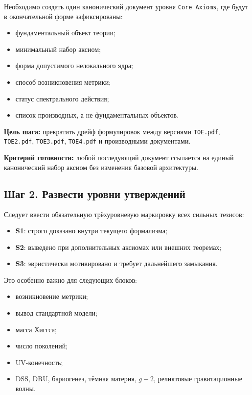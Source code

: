 \documentclass[12pt,a4paper]{article}
\begin{document}
Необходимо создать один канонический документ уровня \texttt{Core Axioms}, где будут в окончательной форме зафиксированы:
\begin{itemize}
    \item фундаментальный объект теории;
    \item минимальный набор аксиом;
    \item форма допустимого нелокального ядра;
    \item способ возникновения метрики;
    \item статус спектрального действия;
    \item список производных, а не фундаментальных объектов.
\end{itemize}

\textbf{Цель шага:} прекратить дрейф формулировок между версиями \texttt{TOE.pdf}, \texttt{ТОЕ2.pdf}, \texttt{ТОЕ3.pdf}, \texttt{ТОЕ4.pdf} и производными документами.

\textbf{Критерий готовности:} любой последующий документ ссылается на единый канонический набор аксиом без изменения базовой архитектуры.

\subsection{Шаг 2. Развести уровни утверждений}

Следует ввести обязательную трёхуровневую маркировку всех сильных тезисов:
\begin{itemize}
    \item \textbf{S1}: строго доказано внутри текущего формализма;
    \item \textbf{S2}: выведено при дополнительных аксиомах или внешних теоремах;
    \item \textbf{S3}: эвристически мотивировано и требует дальнейшего замыкания.
\end{itemize}

Это особенно важно для следующих блоков:
\begin{itemize}
    \item возникновение метрики;
    \item вывод стандартной модели;
    \item масса Хиггса;
    \item число поколений;
    \item UV-конечность;
    \item DSS, DRU, бариогенез, тёмная материя, \(g-2\), реликтовые гравитационные волны.
\end{itemize}
\end{document}
